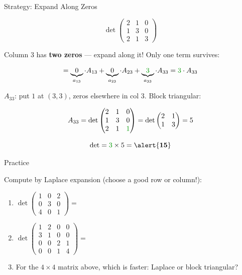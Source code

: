 \documentclass[10pt]{beamer}
\theoremstyle{definition}
\newcommand{\x}[1]{\alert{\textbf{#1}}}
\newcommand{\gn}[1]{{\color{green!60!black}#1}}
\begin{document}
\begin{frame}{Strategy: Expand Along Zeros}

$$
\det\begin{pmatrix} 2 & 1 & 0 \\ 1 & 3 & 0 \\ 2 & 1 & 3 \end{pmatrix}
$$

\vfill
\pause

Column 3 has \x{two zeros} --- expand along it! Only one term survives:

$$
= \underbrace{0}_{a_{13}} \cdot A_{13}
+ \underbrace{0}_{a_{23}} \cdot A_{23}
+ \underbrace{\gn{3}}_{a_{33}} \cdot A_{33}
= \gn{3} \cdot A_{33}
$$

\vfill

$A_{33}$: put $1$ at $(3,3)$, zeros elsewhere in col 3. Block triangular:

$$
A_{33} = \det\begin{pmatrix} 2 & 1 & 0 \\ 1 & 3 & 0 \\ 2 & 1 & \gn{1} \end{pmatrix}
= \det\begin{pmatrix} 2 & 1 \\ 1 & 3 \end{pmatrix} = 5
$$

\vfill

$$
\det = \gn{3} \times 5 = \x{15}
$$

\end{frame}


\begin{frame}{Practice}

Compute by Laplace expansion (choose a good row or column!):

\vfill

\begin{enumerate}
\item $\det\begin{pmatrix} 1 & 0 & 2 \\ 0 & 3 & 0 \\ 4 & 0 & 1 \end{pmatrix} = $

\vfill

\item $\det\begin{pmatrix} 1 & 2 & 0 & 0 \\ 3 & 1 & 0 & 0 \\ 0 & 0 & 2 & 1 \\ 0 & 0 & 1 & 4 \end{pmatrix} = $

\vfill

\item For the $4\times 4$ matrix above, which is faster: Laplace or block triangular?
\end{enumerate}

\vfill

\end{frame}
\end{document}
